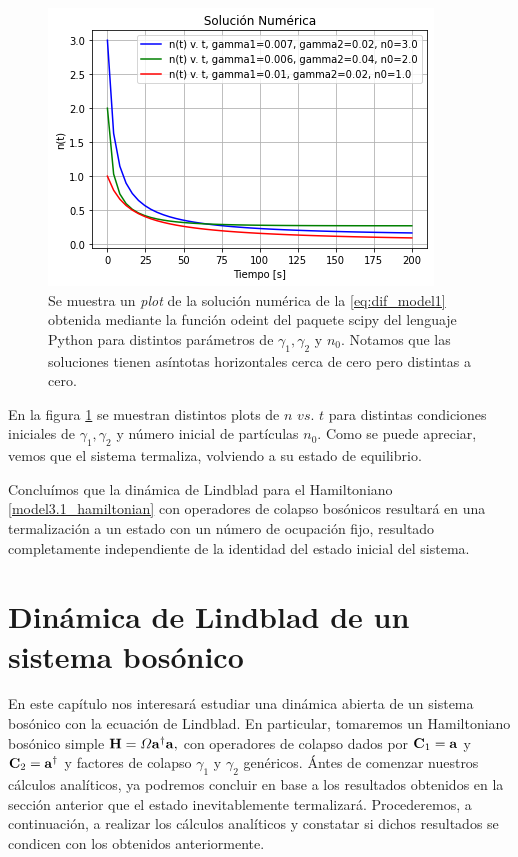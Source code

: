 \documentclass{report} %
\numberwithin{equation}{section}
\begin{document}
\begin{figure}
    \centering
    \includegraphics[scale=1]{figs/tdd_modelito1_sol_eq_diff_modificada.png}
    \caption{Se muestra un \textit{plot} de la solución numérica de la \eqref{eq:dif_model1} obtenida mediante la función odeint del paquete scipy del lenguaje Python para distintos parámetros de $\gamma_1,\gamma_2$ y $n_0$. Notamos que las soluciones tienen asíntotas horizontales cerca de cero pero distintas a cero.}
    \label{fig:tdd_modelito1_sol_eq_diff_odeint_multiples}
\end{figure}

En la figura \ref{fig:tdd_modelito1_sol_eq_diff_odeint_multiples} se muestran distintos plots de $n$ $vs$. $t$ para distintas condiciones iniciales de $\gamma_1, \gamma_2$ y número inicial de partículas $n_0$. Como se puede apreciar, vemos que el sistema termaliza, volviendo a su estado de equilibrio.

Concluímos que la dinámica de Lindblad para el Hamiltoniano \eqref{model3.1_hamiltonian} con operadores de colapso bosónicos resultará en una termalización a un estado con un número de ocupación fijo, resultado completamente independiente de la identidad del estado inicial del sistema.

\section{Din\'amica de Lindblad de un sistema bos\'onico}

En este capítulo nos interesará estudiar una dinámica abierta de un sistema bosónico con la ecuación de Lindblad. En particular, tomaremos un Hamiltoniano bosónico simple ${\bf H} = \Omega {\bf a}^{\dagger} {\bf a},$ con operadores de colapso dados por $\mathbf{C}_1 = {\bf a}$ y $\mathbf{C}_2 = {\bf a}^{\dagger}$ y factores de colapso $\gamma_1$ y $\gamma_2$ genéricos. Ántes de comenzar nuestros cálculos analíticos, ya podremos concluir en base a los resultados obtenidos en la sección anterior que el estado inevitablemente termalizará. Procederemos, a continuación, a realizar los cálculos analíticos y constatar si dichos resultados se condicen con los obtenidos anteriormente. 
\end{document}
